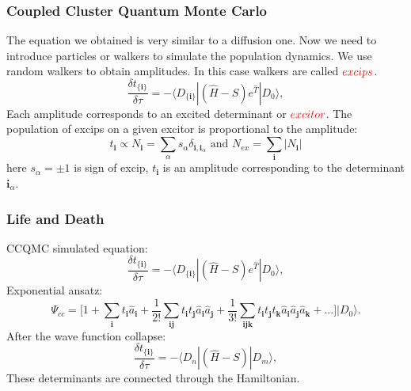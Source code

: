 \documentclass{beamer}
\begin{document}
\begin{frame}
\frametitle{Coupled Cluster Quantum Monte Carlo}
The equation we obtained is very similar to a diffusion one. Now we need to introduce particles or walkers to simulate the population dynamics. We use random walkers to obtain amplitudes. In this case walkers are called ${\color{red}excips}$. 
\begin{equation*}	
\frac{\delta t_{\{\boldsymbol{i}\}}}{\delta\tau} = -\langle D_{\{\boldsymbol{i}\}}|(\hat{H}-S)e^{\hat{T}}|D_0\rangle,
\end{equation*}
Each amplitude corresponds to an excited determinant or ${\color{red}excitor}$. The population of excips on a given excitor is proportional to the amplitude:
\begin{equation*}	
t_{\boldsymbol{i}} \propto N_{\boldsymbol{i}} = \sum_\alpha s_\alpha \delta_{{\boldsymbol{i}}, {\boldsymbol{i}}_\alpha} \text{ and }  N_{ex} = \sum_{\boldsymbol{i}} |N_{\boldsymbol{i}}|
\end{equation*}
here $s_\alpha = \pm 1$ is sign of excip, $t_{\boldsymbol{i}}$ is an amplitude corresponding to the determinant ${{\boldsymbol{i}}_\alpha}$. %
\end{frame}

\begin{frame}
\frametitle{Life and Death}
CCQMC simulated equation:
\begin{equation*}	
\frac{\delta t_{\{\boldsymbol{i}\}}}{\delta\tau} = -\langle D_{\{\boldsymbol{i}\}}|(\hat{H}-S)e^{\hat{T}}|D_0\rangle,
\end{equation*}
Exponential ansatz:
\begin{equation*}
\Psi_{cc} = \big[1 + \sum_{\boldsymbol{i}} t_{\boldsymbol{i}}\hat{a}_{\boldsymbol{i}} + \frac{1}{ 2!}\sum_{\boldsymbol{ij}} t_{\boldsymbol{i}} t_{\boldsymbol{j}} \hat{a}_{\boldsymbol{i}} \hat{a}_{\boldsymbol{j}} + \frac{1}{ 3!}\sum_{\boldsymbol{ijk}}t_{\boldsymbol{i}} t_{\boldsymbol{j}} t_{\boldsymbol{k}} \hat{a}_{\boldsymbol{i}} \hat{a}_{\boldsymbol{j}} \hat{a}_{\boldsymbol{k}} + ...  \big]|D_0\rangle.
\end{equation*}
After the wave function collapse:
\begin{equation*}	
\frac{\delta t_{\{\boldsymbol{i}\}}}{\delta\tau} = -\langle D_n|(\hat{H}-S)|D_m\rangle,
\end{equation*}
These determinants are connected through the Hamiltonian.
\end{frame}
\end{document}
